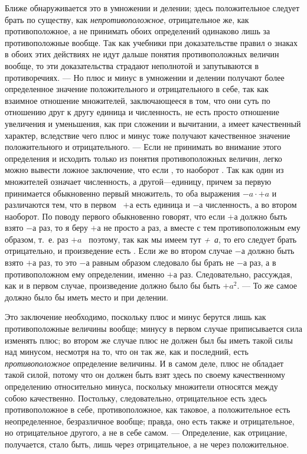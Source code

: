 Ближе обнаруживается это в умножении и делении; здесь положительное следует
брать по существу, как {\em непротивоположное},
отрицательное же, как противоположное, а не принимать обоих определений
одинаково лишь за противоположные вообще. Так как учебники при
доказательстве правил о знаках в обоих этих действиях не идут дальше
понятия противоположных величин вообще, то эти доказательства страдают
неполнотой и запутываются в противоречиях. — Но плюс и минус в умножении и
делении получают более определенное значение положительного и
отрицательного в себе, так как взаимное отношение множителей, заключающееся
в том, что они суть по отношению друг к другу единица и численность, не
есть просто отношение увеличения и уменьшения, как при сложении и
вычитании, а имеет качественный характер, вследствие чего плюс и минус тоже
получают качественное значение положительного и отрицательного. — Если не
принимать во внимание этого определения и исходить только из понятия
противоположных величин, легко можно вывести ложное заключение, что если ,
то наоборот . Так как один из множителей означает численность, а
другой—единицу, причем за первую принимается обыкновенно первый множитель,
то оба выражения  $-a\cdot+a$ и  различаются тем,
что в первом \ $+а$ есть единица и
$-а$ численность, а во втором наоборот. По поводу
первого обыкновенно говорят, что если $+а$ должно
быть взято $-а$ раз, то я беру
$+а$ не просто $а$ раз, а
вместе с тем противоположным ему образом, т.~е.  раз 
$+a${\em\textup{~}}\label{bkm:Ref474666880}
поэтому, так как мы имеем тут {\em +~а}, то его следует
брать отрицательно, и произведение есть . Если же во втором случае
$-а$ должно быть взято
$+а$ раз, то это $-а$
равным образом следовало бы брать не $-а$ раз, а в
противоположном ему определении, именно $+а$ раз.
Следовательно, рассуждая, как и в первом случае, произведение должно было
бы быть  $+a^2$. — То же самое должно было бы иметь место и при
делении.

Это заключение необходимо, поскольку плюс и минус берутся лишь как
противоположные величины вообще; минусу в первом случае приписывается сила
изменять плюс; во втором же случае плюс не должен был бы иметь такой силы
над минусом, несмотря на то, что он так же, как и последний, есть
{\em противоположное} определение величины. И в самом
деле, плюс не обладает такой силой, потому что он должен быть взят здесь по
своему качественному определению относительно минуса, поскольку множители
относятся между собою качественно. Постольку, следовательно, отрицательное
есть здесь противоположное в себе, противоположное, как таковое, а
положительное есть неопределенное, безразличное вообще; правда, оно есть
также и отрицательное, но отрицательное другого, а не в себе самом. —
Определение, как отрицание, получается, стало быть, лишь через
отрицательное, а не через положительное.

